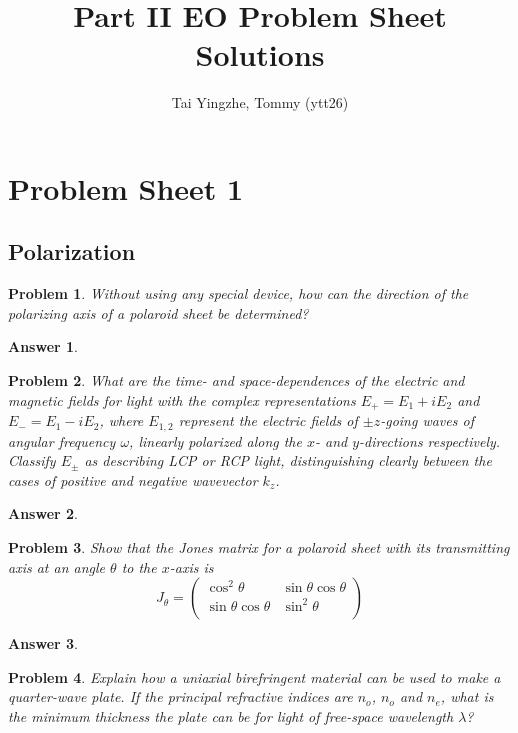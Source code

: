 \documentclass[a4paper]{article}
\title{\textbf{Part II EO Problem Sheet Solutions}}
\author{Tai Yingzhe, Tommy (ytt26)}
\date{}
\newtheorem{ans}{Answer}[section]
\theoremstyle{new}
\newtheorem{qns}{Problem}[section]
\begin{document}
\maketitle
\tableofcontents
\newpage
\section{Problem Sheet 1}
\subsection*{Polarization}
\begin{qns}
Without using any special device, how can the direction of the polarizing axis of a polaroid sheet be determined?
\end{qns}
\begin{ans}

\end{ans}
\begin{qns}
What are the time- and space-dependences of the electric and magnetic fields for light with the complex representations $E_+ = E_1 + iE_2$ and $E_-= E_1 − iE_2$, where $E_{1,2}$ represent the electric fields of $\pm z$-going waves of angular frequency $\omega$, linearly polarized along the $x$- and $y$-directions respectively.\\[5pt]
Classify $E_\pm$ as describing LCP or RCP light, distinguishing clearly between the cases of positive and negative wavevector $k_z$.
\end{qns}
\begin{ans}

\end{ans}
\begin{qns}
Show that the Jones matrix for a polaroid sheet with its transmitting axis at an angle $\theta$ to the $x$-axis is
$$J_\theta=\begin{pmatrix}\cos^2\theta&\sin\theta\cos\theta\\\sin\theta\cos\theta&\sin^2\theta\\\end{pmatrix}$$
\end{qns}
\begin{ans}

\end{ans}
\begin{qns}
Explain how a uniaxial birefringent material can be used to make a quarter-wave plate. If the principal refractive indices are $n_o$, $n_o$ and $n_e$, what is the minimum thickness the plate can be for light of free-space wavelength $\lambda$?
\end{qns}
\end{document}
